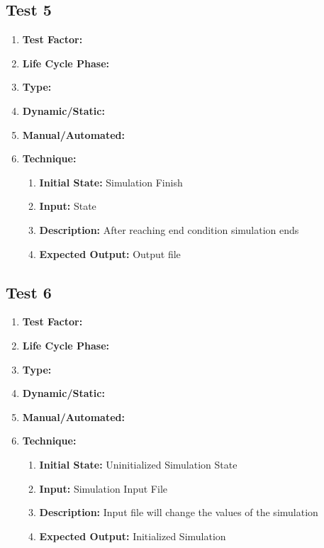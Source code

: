 \documentclass[paper=letter, fontsize=10pt]{scrartcl}
\numberwithin{equation}{section}		%
\numberwithin{figure}{section}			%
\numberwithin{table}{section}				%
\begin{document}
\subsection{Test 5}
\begin{enumerate}[a]
	\item \textbf{Test Factor:}  
	\item \textbf{Life Cycle Phase:}
	\item \textbf{Type:}
	\item \textbf{Dynamic/Static:}
	\item \textbf{Manual/Automated:}
	\item \textbf{Technique:}
		\begin{enumerate}[i]
			\item \textbf{Initial State:} Simulation Finish  
			\item \textbf{Input:} State
			\item \textbf{Description:} After reaching end condition simulation ends
			\item \textbf{Expected Output:} Output file
		\end{enumerate}
\end{enumerate}

\subsection{Test 6}
\begin{enumerate}[a]
	\item \textbf{Test Factor:}  
	\item \textbf{Life Cycle Phase:}
	\item \textbf{Type:}
	\item \textbf{Dynamic/Static:}
	\item \textbf{Manual/Automated:}
	\item \textbf{Technique:}
		\begin{enumerate}[i]
			\item \textbf{Initial State:} Uninitialized Simulation State  
			\item \textbf{Input:} Simulation Input File
			\item \textbf{Description:} Input file will change the values of the simulation
			\item \textbf{Expected Output:} Initialized Simulation
		\end{enumerate}
\end{enumerate}
\end{document}
